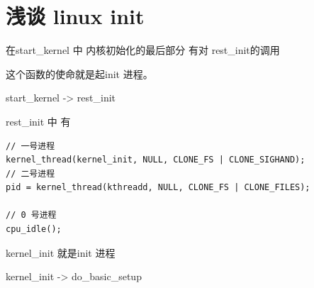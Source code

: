 \section{浅谈 linux init}

在start\_kernel 中 内核初始化的最后部分 有对 rest\_init的调用

这个函数的使命就是起init 进程。

start\_kernel -> rest\_init


rest\_init 中 有
\begin{lstlisting}
// 一号进程 
kernel_thread(kernel_init, NULL, CLONE_FS | CLONE_SIGHAND);
// 二号进程 
pid = kernel_thread(kthreadd, NULL, CLONE_FS | CLONE_FILES);

// 0 号进程 
cpu_idle();
\end{lstlisting}
kernel\_init 就是init 进程



kernel\_init -> do\_basic\_setup



